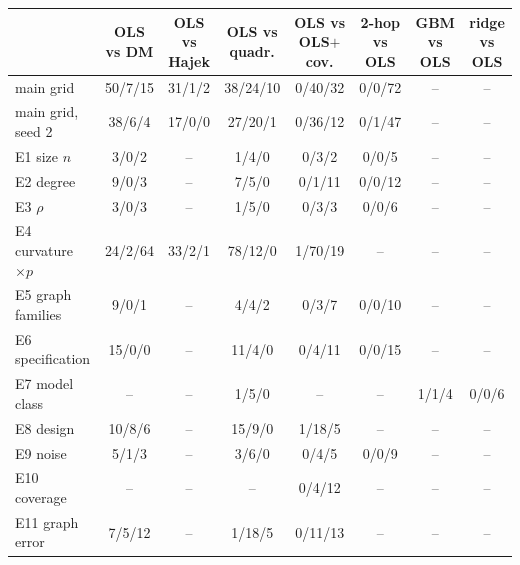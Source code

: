 \begin{tabular}{@{}lccccccc@{}}
\toprule
 & \shortstack{OLS\\vs DM} & \shortstack{OLS vs\\Hajek} & \shortstack{OLS vs\\quadr.} & \shortstack{OLS vs\\OLS$+$cov.} & \shortstack{2-hop\\vs OLS} & \shortstack{GBM\\vs OLS} & \shortstack{ridge\\vs OLS} \\
\midrule
main grid & 50/7/15 & 31/1/2 & 38/24/10 & 0/40/32 & 0/0/72 & -- & -- \\
main grid, seed 2 & 38/6/4 & 17/0/0 & 27/20/1 & 0/36/12 & 0/1/47 & -- & -- \\
E1 size $n$ & 3/0/2 & -- & 1/4/0 & 0/3/2 & 0/0/5 & -- & -- \\
E2 degree & 9/0/3 & -- & 7/5/0 & 0/1/11 & 0/0/12 & -- & -- \\
E3 $\rho$ & 3/0/3 & -- & 1/5/0 & 0/3/3 & 0/0/6 & -- & -- \\
E4 curvature $\times p$ & 24/2/64 & 33/2/1 & 78/12/0 & 1/70/19 & -- & -- & -- \\
E5 graph families & 9/0/1 & -- & 4/4/2 & 0/3/7 & 0/0/10 & -- & -- \\
E6 specification & 15/0/0 & -- & 11/4/0 & 0/4/11 & 0/0/15 & -- & -- \\
E7 model class & -- & -- & 1/5/0 & -- & -- & 1/1/4 & 0/0/6 \\
E8 design & 10/8/6 & -- & 15/9/0 & 1/18/5 & -- & -- & -- \\
E9 noise & 5/1/3 & -- & 3/6/0 & 0/4/5 & 0/0/9 & -- & -- \\
E10 coverage & -- & -- & -- & 0/4/12 & -- & -- & -- \\
E11 graph error & 7/5/12 & -- & 1/18/5 & 0/11/13 & -- & -- & -- \\
\bottomrule
\end{tabular}
